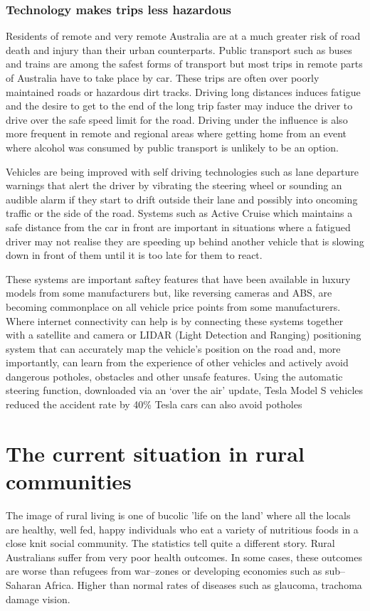 \subsubsection{Technology makes trips less hazardous}
Residents of remote and very remote Australia are at a much greater risk of road death and injury than their urban counterparts. Public transport such as buses and trains are among the safest forms of transport but most trips in remote parts of Australia have to take place by car. These trips are often over poorly maintained roads or hazardous dirt tracks. Driving long distances induces fatigue and the desire to get to the end of the long trip faster may induce the driver to drive over the safe speed limit for the road. Driving under the influence is also more frequent in remote and regional areas where getting home from an event where alcohol was consumed by public transport is unlikely to be an option.

Vehicles are being improved with self driving technologies such as lane departure warnings that alert the driver by vibrating the steering wheel or sounding an audible alarm if they start to drift outside their lane and possibly into oncoming traffic or the side of the road. Systems such as Active Cruise which maintains a safe distance from the car in front are important in situations where a fatigued driver may not realise they are speeding up behind another vehicle that is slowing down in front of them until it is too late for them to react.

These systems are important saftey features that have been available in luxury models from some manufacturers but, like reversing cameras and ABS, are becoming commonplace on all vehicle price points from some manufacturers. Where internet connectivity can help is by connecting these systems together with a satellite and camera or LIDAR (Light Detection and Ranging) positioning system that can accurately map the vehicle's position on the road and, more importantly, can learn from the experience of other vehicles and actively avoid dangerous potholes, obstacles and other unsafe features. Using the automatic steering function, downloaded via an `over the air' update, Tesla Model S vehicles reduced the accident rate by 40\%\cite{RefWorks:352} Tesla cars can also avoid potholes

\section{The current situation in rural communities}
 The image of rural living is one of bucolic 'life on the land' where all the locals are healthy, well fed, happy individuals who eat a variety of nutritious foods in a close knit social community. The statistics tell quite a different story. Rural Australians suffer from very poor health outcomes. In some cases, these outcomes are worse than refugees from war--zones or developing economies such as sub--Saharan Africa. Higher than normal rates of diseases such as glaucoma, trachoma damage vision\cite{RefWorks:197}.
 

